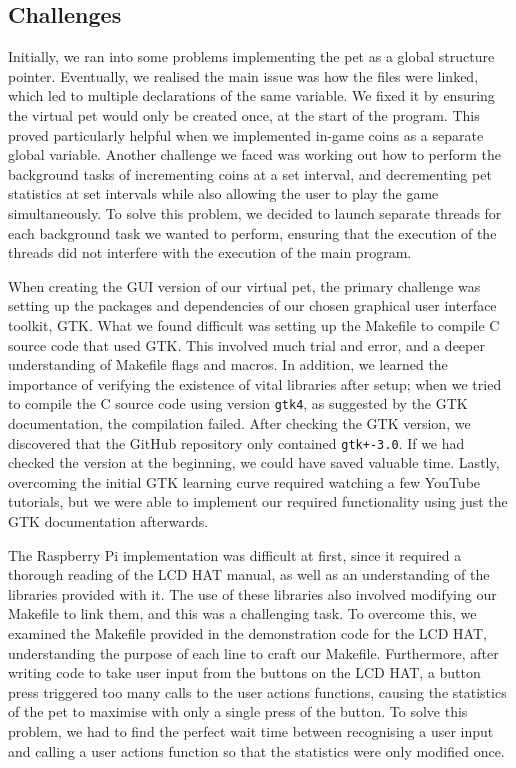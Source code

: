\documentclass[11pt]{article}
\begin{document}
\subsection{Challenges} 

Initially, we ran into some problems implementing the pet as a global structure pointer. 
Eventually, we realised the main issue was how the files were linked, which led to multiple 
declarations of the same variable. We fixed it by ensuring the virtual pet would only be 
created once, at the start of the program. This proved particularly helpful when we implemented 
in-game coins as a separate global variable. Another challenge we faced was working out how to 
perform the background tasks of incrementing coins at a set interval, and decrementing pet 
statistics at set intervals while also allowing the user to play the game simultaneously. To 
solve this problem, we decided to launch separate threads for each background task we wanted 
to perform, ensuring that the execution of the threads did not interfere with the execution 
of the main program.

When creating the GUI version of our virtual pet, the primary challenge was setting up the 
packages and dependencies of our chosen graphical user interface toolkit, GTK. What we found 
difficult was setting up the Makefile to compile C source code that used GTK. This involved 
much trial and error, and a deeper understanding of Makefile flags and macros. In addition, 
we learned the importance of verifying the existence of vital libraries after setup; when we 
tried to compile the C source code using version \texttt{gtk4}, as suggested by the GTK 
documentation, the compilation failed. After checking the GTK version, we discovered that the 
GitHub repository only contained \texttt{gtk+-3.0}. If we had checked the version at the 
beginning, we could have saved valuable time. Lastly, overcoming the initial GTK learning curve 
required watching a few YouTube tutorials, but we were able to implement our required 
functionality using just the GTK documentation afterwards.

The Raspberry Pi implementation was difficult at first, since it required a thorough reading 
of the LCD HAT manual, as well as an understanding of the libraries provided with it. The 
use of these libraries also involved modifying our Makefile to link them, and this was a 
challenging task. To overcome this, we examined the Makefile provided in the demonstration 
code for the LCD HAT, understanding the purpose of each line to craft our Makefile. 
Furthermore, after writing code to take user input from the buttons on the LCD HAT, a button 
press triggered too many calls to the user actions functions, causing the statistics of the 
pet to maximise with only a single press of the button. To solve this problem, we had to 
find the perfect wait time between recognising a user input and calling a user actions function 
so that the statistics were only modified once.
\end{document}

